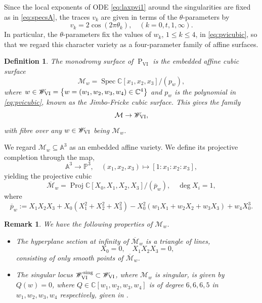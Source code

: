 \documentclass[a4paper,reqno]{amsart}
\numberwithin{equation}{section}
\newcommand{\C}{\mathbb{C}}
\newcommand{\pain}[1]{\operatorname{P}_{\mathrm{#1}}}
\DeclareMathOperator{\Spec}{Spec}
\DeclareMathOperator{\Proj}{Proj}
\newtheorem{definition}[theorem]{Definition}
\newtheorem{remark}[theorem]{Remark}
\numberwithin{equation}{section}
\begin{document}
Since the local exponents of ODE \eqref{eq:laxpvi1} around the singularities are fixed as in \eqref{eq:specsA}, the traces $v_k$ are given in terms of the $\theta$-parameters by
\begin{equation*}
 v_k=2\cos(2\pi\theta_k),
 \quad (k=0,t,1,\infty).
\end{equation*}
In particular, the $\theta$-parameters fix the values of $w_k$, $1\leq k\leq 4$, in \eqref{eq:pvicubic}, so that we regard this character variety as a four-parameter family of affine surfaces.
\begin{definition} \label{def:monodromysurfacefamilyPVI}
    The monodromy surface of $\pain{VI}$ is the embedded affine cubic surface  $$\mathcal{M}_{w}= \Spec \C[x_1,x_2,x_3]/(p_w),$$ 
    where $w\in\mathscr{W}_{\rm VI} = \left\{ w=(w_1,w_2,w_3,w_4) \in \C^4 \right\}$ and $p_w$ is the polynomial in \eqref{eq:pvicubic}, known as the Jimbo-Fricke cubic surface.
    This gives the family
    \begin{equation*}
        \mathcal{M}\to \mathscr{W}_{\rm VI},
    \end{equation*}
    with fibre over any $w\in \mathscr{W}_{\rm VI}$ being $\mathcal{M}_{w}$.
\end{definition}


We regard $\mathcal{M}_w\subseteq \mathbb{A}^3$ as an embedded affine variety. We define its projective completion through the map,
        $$\mathbb{A}^3\rightarrow \mathbb{P}^3,\quad (x_1,x_2,x_3) \mapsto [1:x_1:x_2:x_3],$$
        yielding the projective cubic $$\overline{\mathcal{M}}_w=\Proj \C[X_0,X_1,X_2,X_3]/(\overline{p}_w),\quad \operatorname{deg} X_i=1,$$ where
$$\overline{p}_w:=X_1X_2X_3
+X_0(X_1^2+X_2^2+X_3^2)
-X_0^2\left(w_1 X_1+w_2X_2+w_3 X_3\right)+w_4 X_0^3.$$
        


\begin{remark} \label{rem:propertiesofMwPVI}
We have the following properties of $\mathcal{M}_w$.
    \begin{itemize}
        \item The hyperplane section at infinity of $\overline{\mathcal{M}}_w$ is a triangle of lines,
        \begin{equation*}
            X_0 =0,\quad X_1X_2X_3=0,
        \end{equation*}
        consisting of only smooth points of $\overline{\mathcal{M}}_w$.       
        \item The singular locus $\mathscr{W}_{\rm VI}^{\operatorname{sing}}\subset \mathscr{W}_{\rm VI}$, where $\mathcal{M}_w$ is singular, is given by $Q(w)=0$, where $Q\in \C[w_1,w_2,w_3,w_4]$ is of degree $6,6,6,5$ in $w_1,w_2,w_3,w_4$ respectively, given in .
\end{itemize}

\end{remark}
\end{document}
